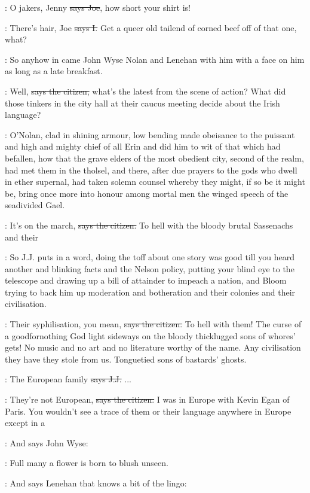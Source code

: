 \joe:
O jakers,
Jenny
\sout{says Joe},
how short your shirt is!

:
There's hair,
Joe
\sout{says I.}
Get a queer old tailend of corned beef off of
that one,
what?

\Nq:
So anyhow in came John Wyse Nolan and Lenehan with him with a
face on him as long as a late breakfast.

\citizen:
Well,
\sout{says the citizen,}
what's the latest from the scene of action?
What
did those tinkers in the city hall at their caucus meeting decide about
the Irish language?

:
O'Nolan,
clad in shining armour,
low bending made obeisance to the
puissant and high and mighty chief of all Erin and did him to wit of that
which had befallen,
how that the grave elders of the most obedient city,
second of the realm,
had met them in the tholsel,
and there,
after due
prayers to the gods who dwell in ether supernal,
had taken solemn counsel
whereby they might,
if so be it might be,
bring once more into honour
among mortal men the winged speech of the seadivided Gael.

\citizen:
It's on the march,
\sout{says the citizen.}
To hell with the bloody brutal
Sassenachs and their 

\Nq:
So J.J.
puts in a word,
doing the toff about one story was good till
you heard another and blinking facts and the Nelson policy,
putting your
blind eye to the telescope and drawing up a bill of attainder to impeach a
nation,
and Bloom trying to back him up moderation and botheration and
their colonies and their civilisation.

\citizen:
Their syphilisation,
you mean,
\sout{says the citizen.}
To hell with them!
The
curse of a goodfornothing God light sideways on the bloody thicklugged
sons of whores' gets!
No music and no art and no literature worthy of the
name.
Any civilisation they have they stole from us.
Tonguetied sons of
bastards' ghosts.

\jjom:
The European family
\sout{says J.J.} ...

\citizen:
They're not European,
\sout{says the citizen.}
I was in Europe with Kevin Egan
of Paris.
You wouldn't see a trace of them or their language anywhere in
Europe except in a 

\Nq:
And says John Wyse:

\johnwyse:
Full many a flower is born to blush unseen.

\Nq:
And says Lenehan that knows a bit of the lingo:

